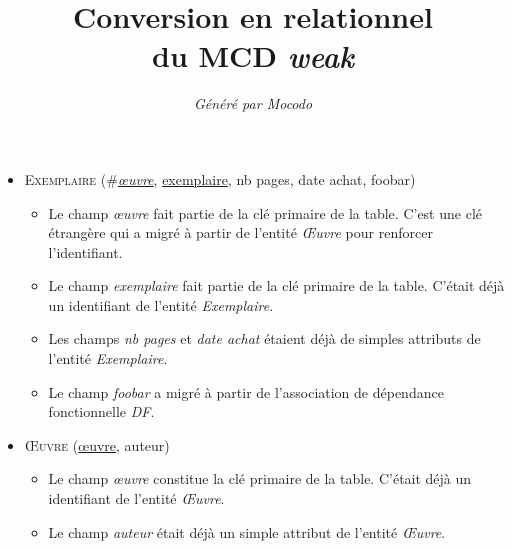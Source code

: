 \documentclass[a4paper]{article}
\title{Conversion en relationnel\\du MCD \emph{weak}}
\author{\emph{Généré par Mocodo}}
\newcommand{\relat}[1]{\textsc{#1}}
\newcommand{\attr}[1]{#1}
\newcommand{\prim}[1]{\uline{#1}}
\newcommand{\foreign}[1]{\#\textsl{#1}}
\begin{document}
\maketitle

\begin{itemize}
  \item \relat{Exemplaire} (\foreign{\prim{œuvre}}, \prim{exemplaire}, \attr{nb pages}, \attr{date achat}, \attr{foobar})
  \begin{itemize}
    \item Le champ \emph{œuvre} fait partie de la clé primaire de la table. C'est une clé étrangère qui a migré à partir de l'entité \emph{Œuvre} pour renforcer l'identifiant.
    \item Le champ \emph{exemplaire} fait partie de la clé primaire de la table. C'était déjà un identifiant de l'entité \emph{Exemplaire}.
    \item Les champs \emph{nb pages} et \emph{date achat} étaient déjà de simples attributs de l'entité \emph{Exemplaire}.
    \item Le champ \emph{foobar} a migré à partir de l'association de dépendance fonctionnelle \emph{DF}.
  \end{itemize}

  \item \relat{Œuvre} (\prim{œuvre}, \attr{auteur})
  \begin{itemize}
    \item Le champ \emph{œuvre} constitue la clé primaire de la table. C'était déjà un identifiant de l'entité \emph{Œuvre}.
    \item Le champ \emph{auteur} était déjà un simple attribut de l'entité \emph{Œuvre}.
  \end{itemize}

\end{itemize}
\end{document}
